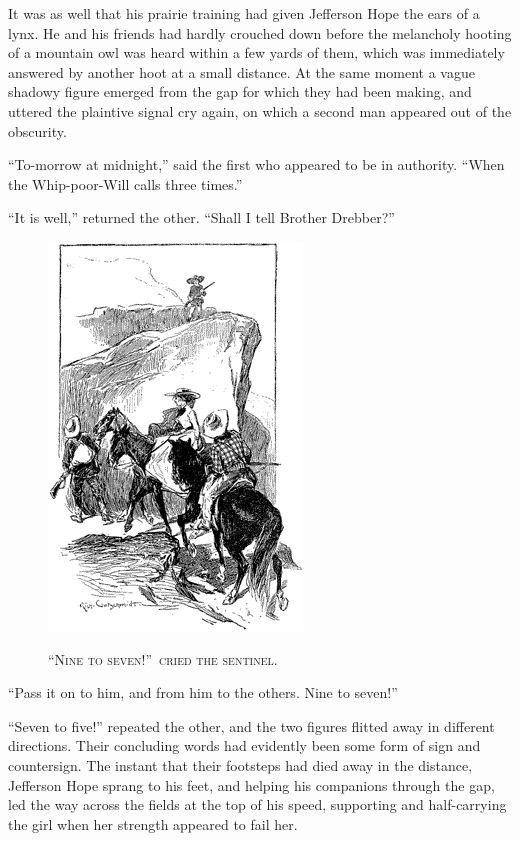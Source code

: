 \documentclass[12pt,english,oneside]{book}
\newcommand{\noun}[1]{\textsc{#1}}
\begin{document}
It was as well that his prairie training had given Jefferson Hope
the ears of a lynx. He and his friends had hardly crouched down before
the melancholy hooting of a mountain owl was heard within a few yards
of them, which was immediately answered by another hoot at a small
distance. At the same moment a vague shadowy figure emerged from the
gap for which they had been making, and uttered the plaintive signal
cry again, on which a second man appeared out of the obscurity.

{}``To-morrow at midnight,'' said the first who appeared to be in
authority. {}``When the Whip-poor-Will calls three times.''

{}``It is well,'' returned the other. {}``Shall I tell Brother
Drebber?''

%
\begin{figure}[htbp]
\noindent \begin{center}\includegraphics{images/study10-stud-20.png}\end{center}

\noindent \begin{center}\noun{{}``Nine to seven!''\ cried the
sentinel.}\end{center}
\end{figure}
{}``Pass it on to him, and from him to the others. Nine to seven!''

{}``Seven to five!'' repeated the other, and the two figures flitted
away in different directions. Their concluding words had evidently
been some form of sign and countersign. The instant that their footsteps
had died away in the distance, Jefferson Hope sprang to his feet,
and helping his companions through the gap, led the way across the
fields at the top of his speed, supporting and half-carrying the girl
when her strength appeared to fail her.
\end{document}
